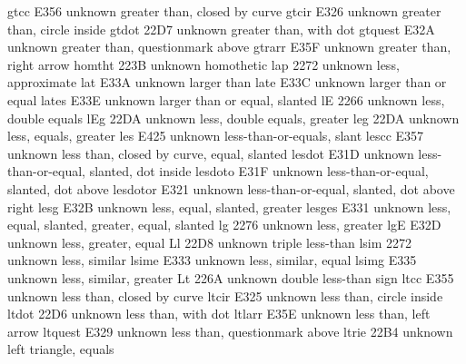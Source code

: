  gtcc                  E356 {unknown} greater than, closed by curve
 gtcir                 E326 {unknown} greater than, circle inside
 gtdot                 22D7 {unknown} greater than, with dot
 gtquest               E32A {unknown} greater than, questionmark above
 gtrarr                E35F {unknown} greater than, right arrow
 homtht                223B {unknown} homothetic
 lap                   2272 {unknown} less, approximate
 lat                   E33A {unknown} larger than
 late                  E33C {unknown} larger than or equal
 lates                 E33E {unknown} larger than or equal, slanted
 lE                    2266 {unknown} less, double equals
 lEg                   22DA {unknown} less, double equals, greater
 leg                   22DA {unknown} less, equals, greater
 les                   E425 {unknown} less-than-or-equals, slant
 lescc                 E357 {unknown} less than, closed by curve, equal, slanted
 lesdot                E31D {unknown} less-than-or-equal, slanted, dot inside
 lesdoto               E31F {unknown} less-than-or-equal, slanted, dot above
 lesdotor              E321 {unknown} less-than-or-equal, slanted, dot above right
 lesg                  E32B {unknown} less, equal, slanted, greater
 lesges                E331 {unknown} less, equal, slanted, greater, equal, slanted
 lg                    2276 {unknown} less, greater
 lgE                   E32D {unknown} less, greater, equal
 Ll                    22D8 {unknown} triple less-than
 lsim                  2272 {unknown} less, similar
 lsime                 E333 {unknown} less, similar, equal
 lsimg                 E335 {unknown} less, similar, greater
 Lt                    226A {unknown} double less-than sign
 ltcc                  E355 {unknown} less than, closed by curve
 ltcir                 E325 {unknown} less than, circle inside
 ltdot                 22D6 {unknown} less than, with dot
 ltlarr                E35E {unknown} less than, left arrow
 ltquest               E329 {unknown} less than, questionmark above
 ltrie                 22B4 {unknown} left triangle, equals

